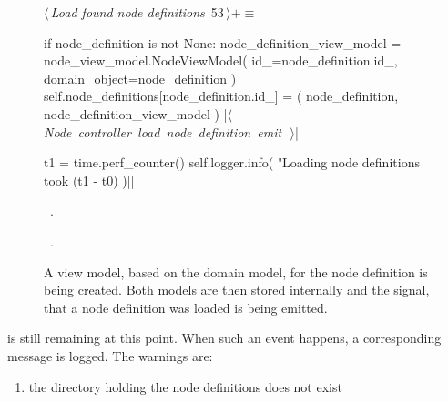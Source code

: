 \documentclass[%
    a4paper,    %
    justified,  %
    nobib,      %
    openany     %
]{tufte-book}
\makeatletter
\renewcommand{\label}[1]{\@tufte@label{##1}}%
\makeatother
\begin{document}
\begin{figure}[!htbp]
  \begin{flushleft} \small
\begin{minipage}{\linewidth}\label{scrap8}\raggedright\small
{} $\langle\,${\itshape Load found node definitions}\nobreak\ {\footnotesize {53}}$\,\rangle+\equiv$
\vspace{-1ex}
\begin{pythoncode}
    if node_definition is not None:
        node_definition_view_model = node_view_model.NodeViewModel(
            id_=node_definition.id_,
            domain_object=node_definition
        )
        self.node_definitions[node_definition.id_] = (
            node_definition,
            node_definition_view_model
        )
        |\hbox{$\langle\,${\itshape Node controller load node definition emit}\nobreak\ {\footnotesize {}}$\,\rangle$}|

t1 = time.perf_counter()
self.logger.info(
    "Loading node definitions took %
    (t1 - t0)
)|\NWsep|
\end{pythoncode}
\vspace{1.5ex}
\footnotesize
\begin{list}{}{\setlength{\itemsep}{-\parsep}\setlength{\itemindent}{-\leftmargin}}
\item \NWtxtMacroDefBy\ .
\item \NWtxtMacroRefIn\ .

\item{}
\end{list}
\end{minipage}\vspace{4ex}
\end{flushleft}
\caption{A view model, based on the domain model, for the node definition is
    being created. Both models are then stored internally and the signal, that a
    node definition was loaded is being emitted.}
\end{figure}

\newpage{}

 is still remaining at this
point. When such an event happens, a corresponding message is logged. The
warnings are:

\begin{enumerate}
  \item the directory holding the node definitions does not exist
\end{enumerate}
\end{document}
